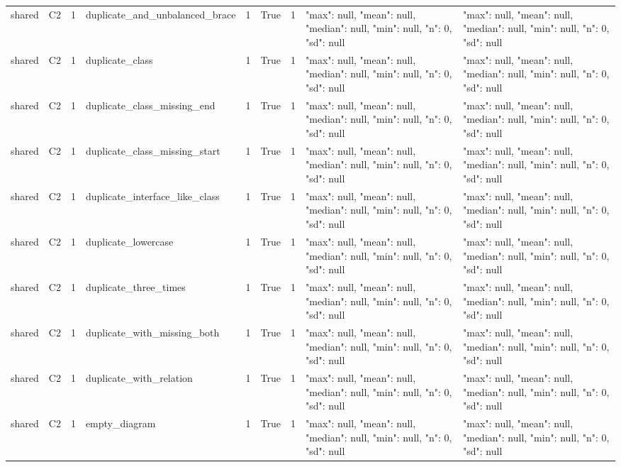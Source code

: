 \begin{tabular}{lllllllll}
shared & C2 & 1 & duplicate\_and\_unbalanced\_brace & 1 & True & 1 & {"max": null, "mean": null, "median": null, "min": null, "n": 0, "sd": null} & {"max": null, "mean": null, "median": null, "min": null, "n": 0, "sd": null} \\
shared & C2 & 1 & duplicate\_class & 1 & True & 1 & {"max": null, "mean": null, "median": null, "min": null, "n": 0, "sd": null} & {"max": null, "mean": null, "median": null, "min": null, "n": 0, "sd": null} \\
shared & C2 & 1 & duplicate\_class\_missing\_end & 1 & True & 1 & {"max": null, "mean": null, "median": null, "min": null, "n": 0, "sd": null} & {"max": null, "mean": null, "median": null, "min": null, "n": 0, "sd": null} \\
shared & C2 & 1 & duplicate\_class\_missing\_start & 1 & True & 1 & {"max": null, "mean": null, "median": null, "min": null, "n": 0, "sd": null} & {"max": null, "mean": null, "median": null, "min": null, "n": 0, "sd": null} \\
shared & C2 & 1 & duplicate\_interface\_like\_class & 1 & True & 1 & {"max": null, "mean": null, "median": null, "min": null, "n": 0, "sd": null} & {"max": null, "mean": null, "median": null, "min": null, "n": 0, "sd": null} \\
shared & C2 & 1 & duplicate\_lowercase & 1 & True & 1 & {"max": null, "mean": null, "median": null, "min": null, "n": 0, "sd": null} & {"max": null, "mean": null, "median": null, "min": null, "n": 0, "sd": null} \\
shared & C2 & 1 & duplicate\_three\_times & 1 & True & 1 & {"max": null, "mean": null, "median": null, "min": null, "n": 0, "sd": null} & {"max": null, "mean": null, "median": null, "min": null, "n": 0, "sd": null} \\
shared & C2 & 1 & duplicate\_with\_missing\_both & 1 & True & 1 & {"max": null, "mean": null, "median": null, "min": null, "n": 0, "sd": null} & {"max": null, "mean": null, "median": null, "min": null, "n": 0, "sd": null} \\
shared & C2 & 1 & duplicate\_with\_relation & 1 & True & 1 & {"max": null, "mean": null, "median": null, "min": null, "n": 0, "sd": null} & {"max": null, "mean": null, "median": null, "min": null, "n": 0, "sd": null} \\
shared & C2 & 1 & empty\_diagram & 1 & True & 1 & {"max": null, "mean": null, "median": null, "min": null, "n": 0, "sd": null} & {"max": null, "mean": null, "median": null, "min": null, "n": 0, "sd": null} \\

\end{tabular}
